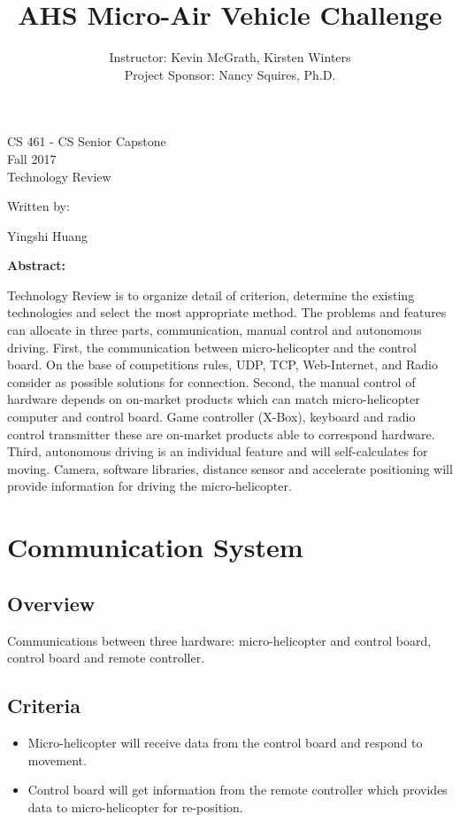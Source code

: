 \documentclass[letterpaper, 10, draftclsnofoot, onecolumn]{IEEEtran}
\date{}
\title{AHS Micro-Air Vehicle Challenge}
\author{ Instructor: Kevin McGrath, Kirsten Winters \\
    Project Sponsor: Nancy Squires, Ph.D.
}
\def\class{CS 461 - CS Senior Capstone}
\def\term{Fall 2017}
\begin{document}
\null  %
\nointerlineskip  %
\vfill
\let\snewpage \newpage
\let\newpage \relax
\maketitle
\begin{center}
\class\\
\term\\
\huge{Technology Review}\par
\vspace{2mm}
\large{Written by:}\par
\normalsize{Yingshi Huang}\par
\vspace{8mm}
\large{\textbf{Abstract:}}\par 
\end{center}
\vspace{2mm}
\normalsize{
Technology Review is to organize detail of criterion, determine the existing technologies and select the most appropriate method. The problems and features can allocate in three parts, communication, manual control and autonomous driving. First, the communication between micro-helicopter and the control board. On the base of competitions rules, UDP, TCP, Web-Internet, and Radio consider as possible solutions for connection. Second, the manual control of hardware depends on on-market products which can match micro-helicopter computer and control board. Game controller (X-Box), keyboard and radio control transmitter these are on-market products able to correspond hardware. Third, autonomous driving is an individual feature and will self-calculates for moving. Camera, software libraries, distance sensor and accelerate positioning will provide information for driving the micro-helicopter. 
}

\let \newpage \snewpage
\break %



\section*{Communication System}
\subsection*{Overview}
Communications between three hardware: micro-helicopter and control board, control board and remote controller.
\subsection*{Criteria}
\begin{itemize}
\item Micro-helicopter will receive data from the control board and respond to movement.
\item Control board will get information from the remote controller which provides data to micro-helicopter for re-position.
\end{itemize}
\end{document}
